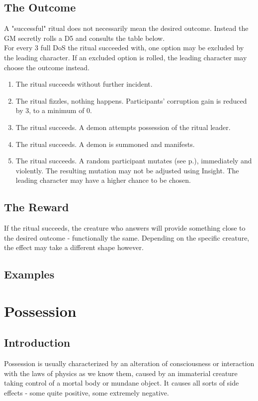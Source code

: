 \documentclass[12pt,a4paper,openany]{book}
\begin{document}
	\section{The Outcome}
	A "successful" ritual does not necessarily mean the desired outcome. Instead the GM secretly rolls a D5 and consults the table below.\\
	For every 3 full DoS the ritual succeeded with, one option may be excluded by the leading character. If an excluded option is rolled, the leading character may choose the outcome instead.
	\par
	\vspace{-5mm}
	\begin{enumerate}
		\raggedright
		\setlength\itemsep{-8mm}
		\item The ritual succeeds without further incident.
		\item The ritual fizzles, nothing happens. Participants' corruption gain is reduced by 3, to a minimum of 0.
		\item The ritual succeeds. A demon attempts possession of the ritual leader.
		\item The ritual succeeds. A demon is summoned and manifests.
		\item The ritual succeeds. A random participant mutates (see p.\pageref{ch:mutation}), immediately and violently.
		The resulting mutation may not be adjusted using Insight.
		The leading character may have a higher chance to be chosen.
	\end{enumerate}
	\section{The Reward}
	If the ritual succeeds, the creature who answers will provide something close to the desired outcome - functionally the same.
	Depending on the specific creature, the effect may take a different shape however.
	\section{Examples}
	
	
	\chapter{Possession}
	\section*{Introduction}
	Possession is usually characterized by
		an alteration of consciousness or interaction with the laws of physics as we know them,
		caused by an immaterial creature taking control of a mortal body or mundane object.
	It causes all sorts of side effects
		- some quite positive, some extremely negative.
	
	
	
\end{document}
